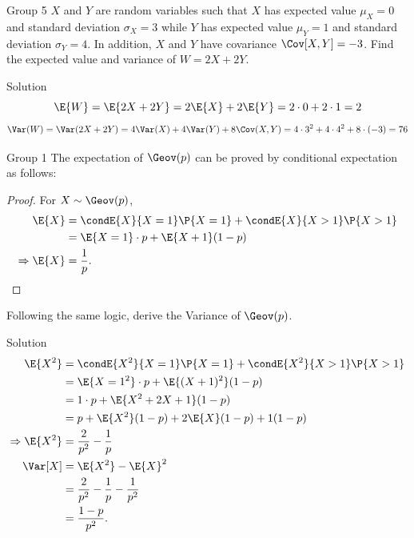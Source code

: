 \documentclass{article}
\theoremstyle{plain}
\theoremstyle{definition}
\theoremstyle{remark}
\begin{document}
\begin{problem}
    {Group 5}
    $X$ and $Y$ are random variables such that $X$ has expected value $\mu_X = 0$ and standard deviation $\sigma_X = 3$ while $Y$ has expected value $\mu_Y = 1$ and standard deviation $\sigma_Y = 4$. In addition, $X$ and $Y$ have covariance $\Cov[X, Y] = -3$. Find the expected value and variance of $W = 2X+2Y$.
\end{problem}

\begin{solution}
    {Solution}
    \[
        \E{W} = \E{2X+2Y} = 2\E{X}+2\E{Y} = 2\cdot 0+2\cdot 1 = 2
    \]
    \[
        \Var(W) = \Var(2X+2Y) = 4\Var(X)+4\Var(Y)+8\Cov(X,Y) = 4\cdot 3^2+4\cdot 4^2+8\cdot (-3) = 76
    \]
\end{solution}
\begin{problem}
    {Group 1}
    The expectation of $\Geov(p)$ can be proved by conditional expectation as follows:
    \begin{proof}
        For $X\sim\Geov(p)$,
        \begin{align*}
            \E{X}
            &= \condE{X}{X=1}\P{X=1}+\condE{X}{X>1}\P{X>1}\\
            &= \E{X=1}\cdot p + \E{X+1}(1-p)\\
            \Rightarrow
            \E{X} &= \frac{1}{p}.
        \end{align*}
    \end{proof}
    Following the same logic, derive the Variance of $\Geov(p)$.
\end{problem}

\begin{solution}
    {Solution}
    \begin{align*}
        \E{X^2}
        &= \condE{X^2}{X=1}\P{X=1}+\condE{X^2}{X>1}\P{X>1}\\
        &= \E{X=1^2}\cdot p + \E{(X+1)^2}(1-p)\\
        &= 1\cdot p + \E{X^2+2X+1}(1-p)\\
        &= p + \E{X^2}(1-p)+2\E{X}(1-p)+1(1-p)\\
        \Rightarrow
        \E{X^2}
        &= \frac{2}{p^2}-\frac{1}{p}\\
        \Var[X]
        &= \E{X^2}-\E{X}^2 \\
        &= \frac{2}{p^2}-\frac{1}{p}-\frac{1}{p^2} \\
        &= \frac{1-p}{p^2}.
    \end{align*}
\end{solution}
\end{document}
